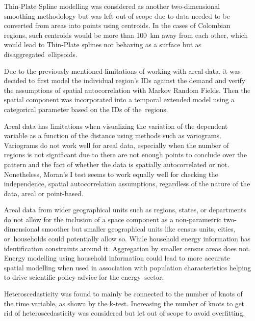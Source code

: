 \documentclass[energies,article,accept,pdftex,moreauthors]{Definitions/mdpi}
\begin{document}
Thin-Plate Spline modelling was considered as another two-dimensional smoothing methodology but was left out of scope due to data needed to be converted from areas into points using centroids. %
 In the cases of Colombian regions, such centroids would be more than 100~km away from each other, which would lead to Thin-Plate splines not behaving as a surface but as disaggregated~ellipsoids. %

Due to the previously mentioned limitations of working with areal data, it was decided to first model the individual region’s IDs against the demand and verify the assumptions of spatial autocorrelation with Markov Random Fields. Then the spatial component was incorporated into a temporal extended model using a categorical parameter based on the IDs of the~regions.

Areal data has limitations when visualizing the variation of the dependent variable as a function of the distance using methods such as variograms. Variograms do not work well for areal data, especially when the number of regions is not significant due to there are not enough points to conclude over the pattern and the fact of whether the data is spatially autocorrelated or not. %
 Nonetheless, Moran’s I test seems to work equally well for checking the independence, spatial autocorrelation assumptions, regardless of the nature of the data, areal or point-based. %

Areal data from wider geographical units such as regions, states, or departments do not allow for the inclusion of a space component as a non-parametric two-dimensional smoother but smaller geographical units like census units, cities, or~households could potentially allow so. While household energy information has identification constraints around it. Aggregation by smaller census areas does not. Energy modelling using household information could lead to more accurate spatial modelling when used in association with population characteristics helping to drive scientific policy advice for the energy~sector.

Heteroscedasticity was found to mainly be connected to the number of knots of the time variable, as shown by the k-test. Increasing the number of knots to get rid of heteroscedasticity was considered but let out of scope to avoid overfitting.

\clearpage


\end{document}
